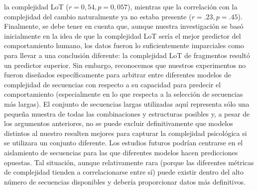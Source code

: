 la complejidad LoT ($r = 0,54, p = 0,057$), mientras que la correlación con la complejidad del cambio naturalmente ya no estaba presente ($r = .23, p = .45$). Finalmente, se debe tener en cuenta que, aunque nuestra investigación se basó inicialmente en la idea de que la complejidad LoT sería el mejor predictor del comportamiento humano, los datos fueron lo suficientemente imparciales como para llevar a una conclusión diferente: la complejidad LoT de fragmentos resultó un predictor superior. Sin embargo, reconocemos que nuestros experimentos no fueron diseñados específicamente para arbitrar entre diferentes modelos de complejidad de secuencias con respecto a su capacidad para predecir el comportamiento (especialmente en lo que respecta a la selección de secuencias más largas). El conjunto de secuencias largas utilizadas aquí representa sólo una pequeña muestra de todas las combinaciones y estructuras posibles y, a pesar de los argumentos anteriores, no se puede excluir definitivamente que modelos distintos al nuestro resulten mejores para capturar la complejidad psicológica si se utilizara un conjunto diferente. Los estudios futuros podrían centrarse en el aislamiento de secuencias para las que diferentes modelos hacen predicciones opuestas. Tal situación, aunque relativamente rara (porque las diferentes métricas de complejidad tienden a correlacionarse entre sí) puede existir dentro del alto número de secuencias disponibles y debería proporcionar datos más definitivos.

